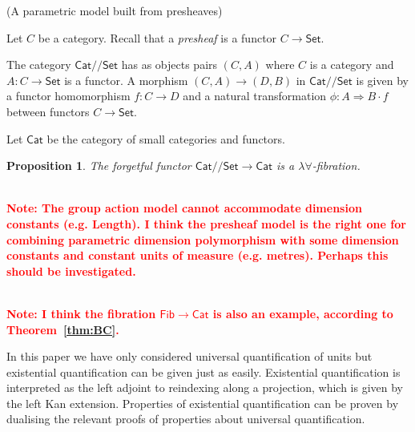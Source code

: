 \documentclass[a4paper,UKenglish]{lipics}
\newtheorem{proposition}[theorem]{Proposition}
\newcommand\note[1]{{ \bf \textcolor{red} {\vspace{2mm}\; \\ Note: #1\\}}}
\newcommand{\ra}{\rightarrow}
\newcommand{\msf}[1]{\mathsf{#1}} %
\newcommand{\Set}{\msf{Set}}
\newcommand{\Cat}{\msf{Cat}}
\newcommand{\Fib}{\msf{Fib}}
\newcommand{\LAb}{\msf{L}_{\msf{Ab}}}
\newcommand{\terminal}{\msf{1}}
\newcommand{\E}{\mathcal{E}}
\newcommand{\fibreE}[1]{\E_{_{#1}}}
\newcommand{\GroupSet}[1]{#1/\!/\Set}
\newcommand{\CatSet}{\GroupSet{\Cat}}
\begin{document}
\begin{example}(A parametric model built from presheaves)
\begin{definition}
Let $C$ be a category. Recall that a \emph{presheaf} is a
functor $C\to\Set$.

The category $\CatSet$ has as objects pairs $(C,A)$ where $C$ is a
category and $A:C\to\Set$ is a functor. A morphism $(C,A) \rightarrow
(D,B)$ in $\CatSet$ is given by a functor homomorphism $f:C\rightarrow D$
and a natural transformation $\phi:A \Rightarrow B\cdot f$ between functors
$C\to\Set$.
\end{definition}

Let $\Cat$ be the category of small categories and functors.
\begin{proposition}
The forgetful functor $\CatSet\to \Cat$ is a $\lambda\forall$-fibration.
\end{proposition}

\note{The group action model cannot accommodate dimension constants (e.g. Length). I think the presheaf model is the right one for combining parametric dimension polymorphism with
some dimension constants and constant units of measure (e.g. metres).
Perhaps this should be investigated.}

\end{example}
\note{I think the fibration $\Fib\to\Cat$ is also an example,
according to Theorem~\ref{thm:BC}. }



\begin{remark}
In this paper we have only considered universal quantification of units but existential quantification can be given just as easily. Existential quantification is interpreted as the left adjoint to reindexing along a projection, which is given by the left Kan extension. Properties of  existential quantification can be proven by dualising the relevant proofs of properties about universal quantification.
\end{remark}
\end{document}
